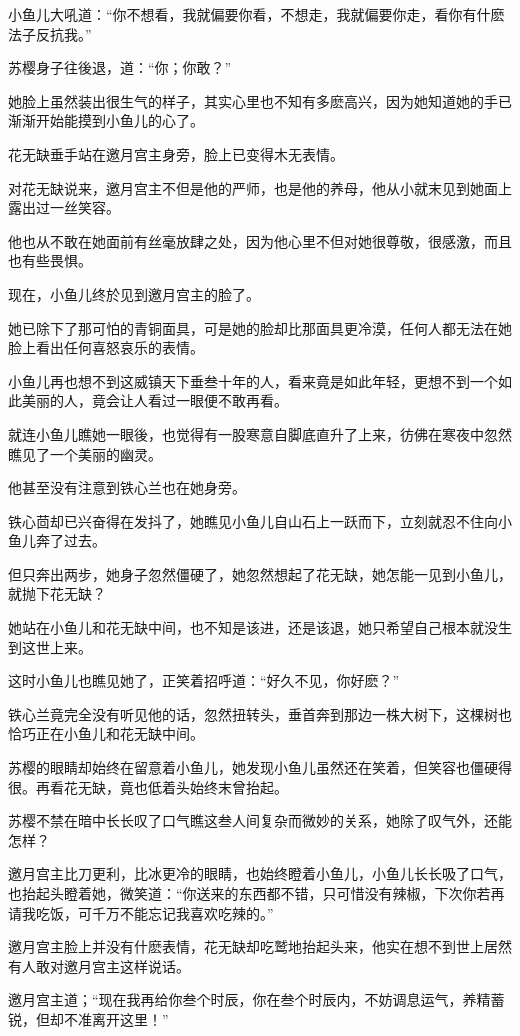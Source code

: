 \documentclass[12pt,oneside]{book}
\begin{document}
小鱼儿大吼道：``你不想看，我就偏要你看，不想走，我就偏要你走，看你有什麽法子反抗我。''

苏樱身子往後退，道：``你；你敢？''

她脸上虽然装出很生气的样子，其实心里也不知有多麽高兴，因为她知道她的手已渐渐开始能摸到小鱼儿的心了。

花无缺垂手站在邀月宫主身旁，脸上已变得木无表情。

对花无缺说来，邀月宫主不但是他的严师，也是他的养母，他从小就末见到她面上露出过一丝笑容。

他也从不敢在她面前有丝毫放肆之处，因为他心里不但对她很尊敬，很感激，而且也有些畏惧。

现在，小鱼儿终於见到邀月宫主的脸了。

她已除下了那可怕的青铜面具，可是她的脸却比那面具更冷漠，任何人都无法在她脸上看出任何喜怒哀乐的表情。

小鱼儿再也想不到这威镇天下垂叁十年的人，看来竟是如此年轻，更想不到一个如此美丽的人，竟会让人看过一眼便不敢再看。

就连小鱼儿瞧她一眼後，也觉得有一股寒意自脚底直升了上来，彷佛在寒夜中忽然瞧见了一个美丽的幽灵。

他甚至没有注意到铁心兰也在她身旁。

铁心茴却已兴奋得在发抖了，她瞧见小鱼儿自山石上一跃而下，立刻就忍不住向小鱼儿奔了过去。

但只奔出两步，她身子忽然僵硬了，她忽然想起了花无缺，她怎能一见到小鱼儿，就抛下花无缺？

她站在小鱼儿和花无缺中间，也不知是该进，还是该退，她只希望自己根本就没生到这世上来。

这时小鱼儿也瞧见她了，正笑着招呼道：``好久不见，你好麽？''

铁心兰竟完全没有听见他的话，忽然扭转头，垂首奔到那边一株大树下，这棵树也恰巧正在小鱼儿和花无缺中间。

苏樱的眼睛却始终在留意着小鱼儿，她发现小鱼儿虽然还在笑着，但笑容也僵硬得很。再看花无缺，竟也低着头始终末曾抬起。

苏樱不禁在暗中长长叹了口气瞧这叁人间复杂而微妙的关系，她除了叹气外，还能怎样？

邀月宫主比刀更利，比冰更冷的眼睛，也始终瞪着小鱼儿，小鱼儿长长吸了口气，也抬起头瞪着她，微笑道：``你送来的东西都不错，只可惜没有辣椒，下次你若再请我吃饭，可千万不能忘记我喜欢吃辣的。''

邀月宫主脸上并没有什麽表情，花无缺却吃鹫地抬起头来，他实在想不到世上居然有人敢对邀月宫主这样说话。

邀月宫主道；``现在我再给你叁个时辰，你在叁个时辰内，不妨调息运气，养精蓄锐，但却不准离开这里！''
\end{document}
